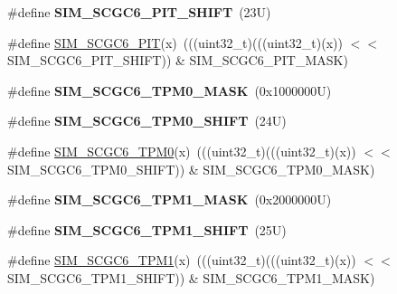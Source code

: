 \begin{DoxyCompactItemize}
\mbox{\label{group___s_i_m___register___masks_ga2600ceb860eb353aa61abbecdbf5b6ae}} 
\#define {\bfseries S\+I\+M\+\_\+\+S\+C\+G\+C6\+\_\+\+P\+I\+T\+\_\+\+S\+H\+I\+FT}~(23\+U)
\item 
\#define \mbox{\hyperlink{group___s_i_m___register___masks_ga16d21af29d691ae7d8b70b5e2d308da9}{S\+I\+M\+\_\+\+S\+C\+G\+C6\+\_\+\+P\+IT}}(x)~(((uint32\+\_\+t)(((uint32\+\_\+t)(x)) $<$$<$ S\+I\+M\+\_\+\+S\+C\+G\+C6\+\_\+\+P\+I\+T\+\_\+\+S\+H\+I\+FT)) \& S\+I\+M\+\_\+\+S\+C\+G\+C6\+\_\+\+P\+I\+T\+\_\+\+M\+A\+SK)
\item 
\mbox{\label{group___s_i_m___register___masks_gad879476f2922fd7dad2f65d3d052e95d}} 
\#define {\bfseries S\+I\+M\+\_\+\+S\+C\+G\+C6\+\_\+\+T\+P\+M0\+\_\+\+M\+A\+SK}~(0x1000000\+U)
\item 
\mbox{\label{group___s_i_m___register___masks_ga9e379c439a6d1d14f65b4c58c46453c5}} 
\#define {\bfseries S\+I\+M\+\_\+\+S\+C\+G\+C6\+\_\+\+T\+P\+M0\+\_\+\+S\+H\+I\+FT}~(24\+U)
\item 
\#define \mbox{\hyperlink{group___s_i_m___register___masks_gab557b317ab5428206e831b7684c339d0}{S\+I\+M\+\_\+\+S\+C\+G\+C6\+\_\+\+T\+P\+M0}}(x)~(((uint32\+\_\+t)(((uint32\+\_\+t)(x)) $<$$<$ S\+I\+M\+\_\+\+S\+C\+G\+C6\+\_\+\+T\+P\+M0\+\_\+\+S\+H\+I\+FT)) \& S\+I\+M\+\_\+\+S\+C\+G\+C6\+\_\+\+T\+P\+M0\+\_\+\+M\+A\+SK)
\item 
\mbox{\label{group___s_i_m___register___masks_ga94a77c9065fd06f267b9920024067cd6}} 
\#define {\bfseries S\+I\+M\+\_\+\+S\+C\+G\+C6\+\_\+\+T\+P\+M1\+\_\+\+M\+A\+SK}~(0x2000000\+U)
\item 
\mbox{\label{group___s_i_m___register___masks_ga26bf0c38385affd6680bb0f4853e43df}} 
\#define {\bfseries S\+I\+M\+\_\+\+S\+C\+G\+C6\+\_\+\+T\+P\+M1\+\_\+\+S\+H\+I\+FT}~(25\+U)
\item 
\#define \mbox{\hyperlink{group___s_i_m___register___masks_ga4b3e49db20b1e3335a180d8cf8886ced}{S\+I\+M\+\_\+\+S\+C\+G\+C6\+\_\+\+T\+P\+M1}}(x)~(((uint32\+\_\+t)(((uint32\+\_\+t)(x)) $<$$<$ S\+I\+M\+\_\+\+S\+C\+G\+C6\+\_\+\+T\+P\+M1\+\_\+\+S\+H\+I\+FT)) \& S\+I\+M\+\_\+\+S\+C\+G\+C6\+\_\+\+T\+P\+M1\+\_\+\+M\+A\+SK)
\item 
$$
\end{DoxyCompactItemize}
